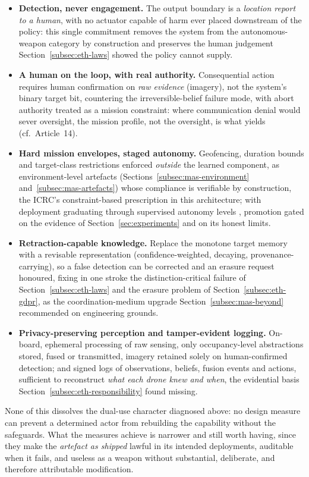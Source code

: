 \begin{itemize}[leftmargin=1.5em,itemsep=1pt]
  \item \textbf{Detection, never engagement.} The output boundary is a
    \emph{location report to a human}, with no actuator capable of harm ever
    placed downstream of the policy: this single commitment removes the system
    from the autonomous-weapon category by construction and preserves the human
    judgement Section~\ref{subsec:eth-laws} showed the policy cannot supply.
  \item \textbf{A human on the loop, with real authority.} Consequential action
    requires human confirmation on \emph{raw evidence} (imagery), not the
    system's binary target bit, countering the irreversible-belief failure mode,
    with abort authority treated as a mission constraint: where communication
    denial would sever oversight, the mission profile, not the oversight, is what
    yields (cf.\ Article~14).
  \item \textbf{Hard mission envelopes, staged autonomy.} Geofencing, duration
    bounds and target-class restrictions enforced \emph{outside} the learned
    component, as environment-level artefacts
    (Sections~\ref{subsec:mas-environment} and~\ref{subsec:mas-artefacts}) whose
    compliance is verifiable by construction, the ICRC's constraint-based
    prescription \citep{icrc2021position} in this architecture; with deployment
    graduating through supervised autonomy levels
    \citep{sae2021j3016,dod2012autonomy}, promotion gated on the evidence of
    Section~\ref{sec:experiments} and on its honest limits.
  \item \textbf{Retraction-capable knowledge.} Replace the monotone target
    memory with a revisable representation (confidence-weighted, decaying,
    provenance-carrying), so a false detection can be corrected and an erasure
    request honoured, fixing in one stroke the distinction-critical failure of
    Section~\ref{subsec:eth-laws} and the erasure problem of
    Section~\ref{subsec:eth-gdpr}, as the coordination-medium upgrade
    Section~\ref{subsec:mas-beyond} recommended on engineering grounds.
  \item \textbf{Privacy-preserving perception and tamper-evident logging.}
    On-board, ephemeral processing of raw sensing, only occupancy-level
    abstractions stored, fused or transmitted, imagery retained solely on
    human-confirmed detection; and signed logs of observations, beliefs, fusion
    events and actions, sufficient to reconstruct \emph{what each drone knew and
    when}, the evidential basis Section~\ref{subsec:eth-responsibility} found
    missing.
\end{itemize}

None of this dissolves the dual-use character diagnosed above: no design measure
can prevent a determined actor from rebuilding the capability without the
safeguards. What the measures achieve is narrower and still worth having, since
they make the \emph{artefact as shipped} lawful in its intended deployments,
auditable when it fails, and useless as a weapon without substantial,
deliberate, and therefore attributable modification.
